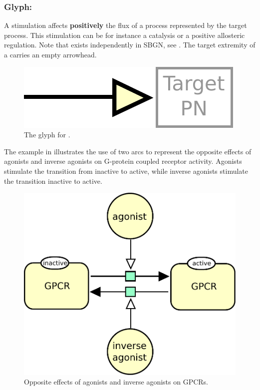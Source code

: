 
\subsubsection{Glyph: }\label{sec:stimulation}

A stimulation affects \textbf{positively} the flux of a process represented by the target process. This stimulation can be for instance a catalysis or a positive allosteric regulation. Note that  exists independently in SBGN, see . The target extremity of a  carries an empty arrowhead.

\begin{figure}[H]
  \centering
  \includegraphics[scale = 0.5]{le_images/stimulation}
  \caption{The \PD glyph for .}
  \label{fig:stimulation}
\end{figure}

The example in  illustrates the use of two  arcs to represent the opposite effects of agonists and inverse agonists on G-protein coupled receptor activity. Agonists stimulate the transition from inactive to active, while inverse agonists stimulate the transition inactive to active.

\begin{figure}[H]
  \centering
  \includegraphics[scale = 0.5]{le_images/stimulation-reversible}
  \caption{Opposite effects of agonists and inverse agonists on GPCRs.}
  \label{fig:stimulation-reversible}
\end{figure}

